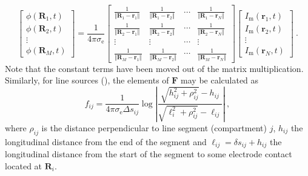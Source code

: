 \begin{equation}
\begin{bmatrix}
\phi(\mathbf{R}_1, t) \\
\phi(\mathbf{R}_2, t) \\
\vdots \\
\phi(\mathbf{R}_M, t) 
\end{bmatrix}
= \frac{1}{4\pi\sigma_\mathrm{e}}
\begin{bmatrix}
\frac{1}{\Vert\mathbf{R}_1 - \mathbf{r}_1\Vert} & \frac{1}{\Vert\mathbf{R}_1 - \mathbf{r}_2\Vert} & \cdots & \frac{1}{\Vert\mathbf{R}_1 - \mathbf{r}_N\Vert} \\
\frac{1}{\Vert\mathbf{R}_2 - \mathbf{r}_1\Vert} & \frac{1}{\Vert\mathbf{R}_2 - \mathbf{r}_2\Vert} & \cdots & \frac{1}{\Vert\mathbf{R}_2 - \mathbf{r}_N\Vert} \\
\vdots & \vdots & \cdots & \vdots \\
\frac{1}{\Vert\mathbf{R}_M - \mathbf{r}_1\Vert} & \frac{1}{\Vert\mathbf{R}_M - \mathbf{r}_2\Vert} & \cdots & \frac{1}{\Vert\mathbf{R}_M - \mathbf{r}_N\Vert}
\end{bmatrix}
\begin{bmatrix}
I_\mathrm{m}(\mathbf{r}_1, t) \\
I_\mathrm{m}(\mathbf{r}_2, t) \\
\vdots \\
I_\mathrm{m}(\mathbf{r}_N, t)
\end{bmatrix} ~.
\end{equation}
%
Note that the constant terms have been moved out of the matrix multiplication. 
Similarly, for line sources (), the elements of $\mathbf{F}$ may be calculated as
%
\begin{equation}
f_{ij} = \frac{1}{4\pi \sigma_\mathrm{e} \Delta s_{ij}} \log \left| \frac{\sqrt{h_{ij}^2+\rho_{ij}^2}-h_{ij}}{\sqrt{\ell_i^2+\rho_{ij}^2}-\ell_{ij}} \right| ~,
\label{eq:LFPy:linesources}
\end{equation}
%
where $\rho_{ij}$ is the distance perpendicular to line segment (compartment) $j$, 
$h_{ij}$ the longitudinal distance from the end of the segment
and $\ell_{ij} = \delta s_{ij} + h_{ij}$ the longitudinal distance from the start of the segment to some electrode contact located at $\mathbf{R}_i$. 

